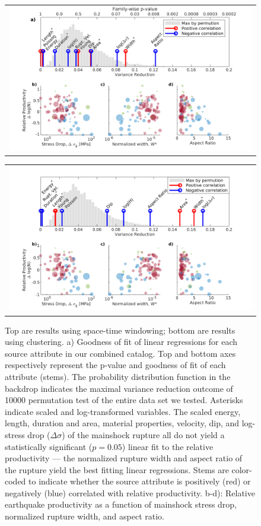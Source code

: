 \documentclass[draft]{agujournal}
\begin{document}
\begin{figure}[H]
    \centering
    \begin{tabular}{@{}c@{}}
        \includegraphics[width = 0.8\linewidth]{figures/stem_plot.png}
    \end{tabular}
    
    \begin{tabular}{@{}c@{}}
        \includegraphics[width = 0.8\linewidth]{figures/stem_plot_z2008.png}
    \end{tabular}
    
    \caption{Top are results using space-time windowing; bottom are results using \citet{Zaliapin2008} clustering. a) Goodness of fit of linear regressions for each source attribute in our combined catalog. Top and bottom axes respectively represent the p-value and goodness of fit of each attribute (stems). The probability distribution function in the backdrop indicates the maximal variance reduction outcome of 10000 permutation test of the entire data set we tested. Asterisks indicate scaled and log-transformed variables. The scaled energy, length, duration and area, material properties, velocity, dip, and log-stress drop ($\Delta\sigma$) of the mainshock rupture all do not yield a statistically significant ($p=0.05$) linear fit to the relative productivity — the normalized rupture width and aspect ratio of the rupture yield the best fitting linear regressions. Stems are color-coded to indicate whether the source attribute is positively (red) or negatively (blue) correlated with relative productivity. b-d): Relative earthquake productivity as a function of mainshock stress drop, normalized rupture width, and aspect ratio.}
        \label{fig:r2_finite_fault_z2008}
\end{figure}
\end{document}

